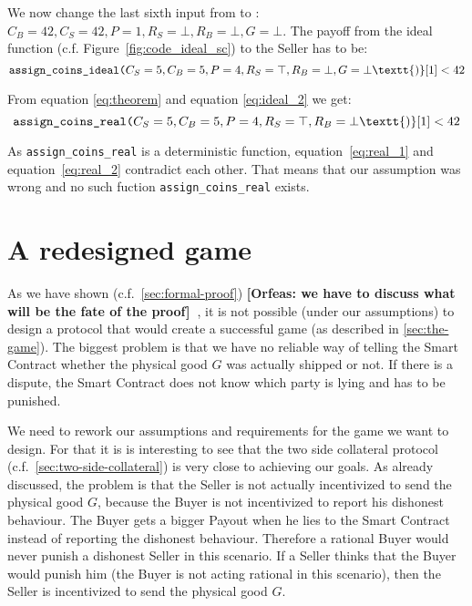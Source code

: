 \documentclass{cacthesis}
\newcommand{\authnote}[3]{{ \footnotesize \textbf{#1[#2: #3]~}}}
\newcommand{\orfnote}[1]{\authnote{\color{blue}}{Orfeas}{#1}}
\begin{document}
We now change the last sixth input from \top to \bot: $C_B=42,C_S=42,P=1,R_S=\bot,R_B=\bot,G=\bot$. The payoff from the ideal function (c.f. Figure~\ref{fig:code_ideal_sc}) to the Seller has to be:
\begin{equation}
\label{eq:ideal_2}
    \texttt{assign\_coins\_ideal(}C_S=5,C_B=5,P=4, R_S=\top,R_B=\bot,G=\bot\textt{)}[1] <  42
\end{equation}

From equation \ref{eq:theorem} and equation \ref{eq:ideal_2} we get:
\begin{equation}
\label{eq:real_2}
    \texttt{assign\_coins\_real(}C_S=5,C_B=5,P=4,R_S=\top,R_B=\bot\textt{)}[1] <  42
\end{equation}

As \texttt{assign\_coins\_real} is a deterministic function, equation~\ref{eq:real_1} and equation~\ref{eq:real_2} contradict each other. That means that our assumption was wrong and no such fuction  \texttt{assign\_coins\_real} exists.



\chapter{A redesigned game}
\label{cha:redisigned-game}

As we have shown (c.f.~\ref{sec:formal-proof}) \orfnote{we have to discuss what will be the fate of the
proof}, it is not possible (under our assumptions) to design a protocol that would create a successful game (as described in \ref{sec:the-game}). The biggest problem is that we have no reliable way of telling the Smart Contract whether the physical good $G$ was actually shipped or not. If there is a dispute, the Smart Contract does not know which party is lying and has to be punished.\newline

We need to rework our assumptions and requirements for the game we want to design. For that it is is interesting to see that the two side collateral protocol (c.f.~\ref{sec:two-side-collateral}) is very close to achieving our goals. As already discussed, the problem is that the Seller is not actually incentivized to send the physical good $G$, because the Buyer is not incentivized to report his dishonest behaviour. The Buyer gets a bigger Payout when he lies to the Smart Contract instead of reporting the dishonest behaviour. Therefore a rational Buyer would never punish a dishonest Seller in this scenario. If a Seller thinks that the Buyer would punish him (the Buyer is not acting rational in this scenario), then the Seller is incentivized to send the physical good $G$.\newline
\end{document}
